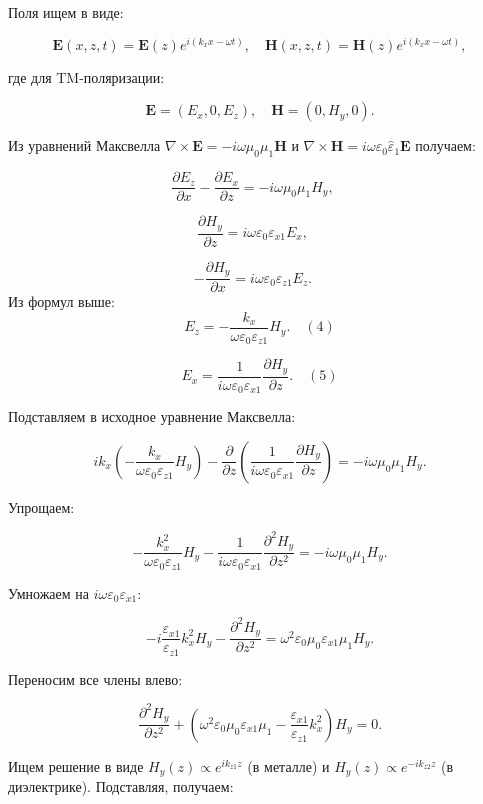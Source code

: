 \documentclass{article}
\begin{document}
Поля ищем в виде:

\[
\mathbf{E}(x,z,t) = \mathbf{E}(z) e^{i(k_x x - \omega t)}, \quad \mathbf{H}(x,z,t) = \mathbf{H}(z) e^{i(k_x x - \omega t)},
\]

где для TM-поляризации:

\[
\mathbf{E} = (E_x, 0, E_z), \quad \mathbf{H} = (0, H_y, 0).
\]

Из уравнений Максвелла \(\nabla \times \mathbf{E} = -i\omega \mu_0 \mu_1 \mathbf{H}\) и \(\nabla \times \mathbf{H} = i\omega \varepsilon_0 \hat{\varepsilon}_1 \mathbf{E}\) получаем:

\[
\frac{\partial E_z}{\partial x} - \frac{\partial E_x}{\partial z} = -i\omega \mu_0 \mu_1 H_y, \quad
\]

\[
\frac{\partial H_y}{\partial z} = i\omega \varepsilon_0 \varepsilon_{x1} E_x, \quad
\]

\[
-\frac{\partial H_y}{\partial x} = i\omega \varepsilon_0 \varepsilon_{z1} E_z. \quad
\]
Из формул выше:
\[
E_z = -\frac{k_x}{\omega \varepsilon_0 \varepsilon_{z1}} H_y. \quad (4)
\]

\[
E_x = \frac{1}{i\omega \varepsilon_0 \varepsilon_{x1}} \frac{\partial H_y}{\partial z}. \quad (5)
\]

Подставляем в исходное уравнение Максвелла:

\[
ik_x \left(-\frac{k_x}{\omega \varepsilon_0 \varepsilon_{z1}} H_y\right) - \frac{\partial}{\partial z} \left(\frac{1}{i\omega \varepsilon_0 \varepsilon_{x1}} \frac{\partial H_y}{\partial z}\right) = -i\omega \mu_0 \mu_1 H_y.
\]

Упрощаем:

\[
-\frac{k_x^2}{\omega \varepsilon_0 \varepsilon_{z1}} H_y - \frac{1}{i\omega \varepsilon_0 \varepsilon_{x1}} \frac{\partial^2 H_y}{\partial z^2} = -i\omega \mu_0 \mu_1 H_y.
\]

Умножаем на \(i\omega \varepsilon_0 \varepsilon_{x1}\):

\[
-i \frac{\varepsilon_{x1}}{\varepsilon_{z1}} k_x^2 H_y - \frac{\partial^2 H_y}{\partial z^2} = \omega^2 \varepsilon_0 \mu_0 \varepsilon_{x1} \mu_1 H_y.
\]

Переносим все члены влево:

\[
\frac{\partial^2 H_y}{\partial z^2} + \left(\omega^2 \varepsilon_0 \mu_0 \varepsilon_{x1} \mu_1 - \frac{\varepsilon_{x1}}{\varepsilon_{z1}} k_x^2\right) H_y = 0.
\]

Ищем решение в виде \(H_y(z) \propto e^{i k_{z1} z}\) (в металле) и \(H_y(z) \propto e^{-i k_{z2} z}\) (в диэлектрике). Подставляя, получаем:
\end{document}
